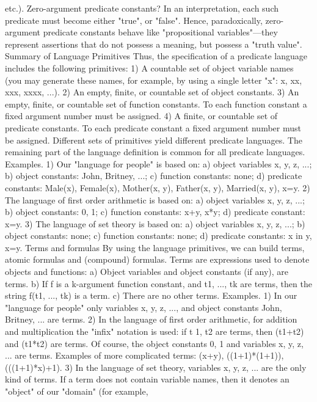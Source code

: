 etc.).
Zero-argument predicate constants? In an interpretation, each such predicate must become either "true", or "false". Hence,
paradoxically, zero-argument predicate constants behave like "propositional variables"---they represent assertions that do not
possess a meaning, but possess a "truth value".
Summary of Language Primitives
Thus, the specification of a predicate language includes the following primitives:
1) A countable set of object variable names (you may generate these names, for example, by using a
single letter "x": x, xx, xxx, xxxx, ...).
2) An empty, finite, or countable set of object constants.
3) An empty, finite, or countable set of function constants. To each function constant a fixed argument
number must be assigned.
4) A finite, or countable set of predicate constants. To each predicate constant a fixed argument number
must be assigned.
Different sets of primitives yield different predicate languages. The remaining part of the language
definition is common for all predicate languages.
Examples. 1) Our "language for people" is based on: a) object variables x, y, z, ...; b) object constants: John, Britney, ...; c)
function constants: none; d) predicate constants: Male(x), Female(x), Mother(x, y), Father(x, y), Married(x, y), x=y.
2) The language of first order arithmetic is based on: a) object variables x, y, z, ...; b) object constants: 0, 1; c) function
constants: x+y, x*y; d) predicate constant: x=y.
3) The language of set theory is based on: a) object variables x, y, z, ...; b) object constants: none; c) function constants: none;
d) predicate constants: x in y, x=y.
Terms and formulas
By using the language primitives, we can build terms, atomic formulas and (compound) formulas.
Terms are expressions used to denote objects and functions:
a) Object variables and object constants (if any), are terms.
b) If f is a k-argument function constant, and t1, ..., tk are terms, then the string f(t1, ..., tk) is a term.
c) There are no other terms.
Examples. 1) In our "language for people" only variables x, y, z, ..., and object constants John, Britney, ... are terms.
2) In the language of first order arithmetic, for addition and multiplication the "infix" notation is used: if t 1, t2 are terms, then
(t1+t2) and (t1*t2) are terms. Of course, the object constants 0, 1 and variables x, y, z, ... are terms. Examples of more
complicated terms: (x+y), ((1+1)*(1+1)), (((1+1)*x)+1).
3) In the language of set theory, variables x, y, z, ... are the only kind of terms.
If a term does not contain variable names, then it denotes an "object" of our "domain" (for example,
